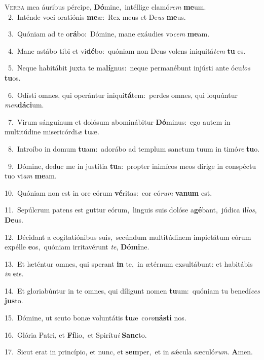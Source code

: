 \lettrine{\initial\textcolor{\initialcolor}{V}}{erba} mea áuribus pércipe, \textbf{Dó}\-mine,~\star intéllige clamó\textit{rem} \textbf{me}\-um.\\
{\numbfont\textcolor{\numbcolor}{~2.}}~Inténde voci oratiónis \textbf{me}\-æ:~\star Rex meus et De\textit{us} \textbf{me}\-us.\par
{\numbfont\textcolor{\numbcolor}{~3.}}~Quóniam ad te o\-\textbf{rá}\-bo:~\star Dómine, mane exáudies vo\textit{cem} \textbf{me}\-am.\par
{\numbfont\textcolor{\numbcolor}{~4.}}~Mane astábo tibi et vi\-\textbf{dé}\-bo:~\star quóniam non Deus volens iniquitá\textit{tem} \textbf{tu} es.\par
{\numbfont\textcolor{\numbcolor}{~5.}}~Neque habitábit juxta te ma\-\textbf{lí}\-gnus:~\star neque permanébunt injústi ante ócu\textit{los} \textbf{tu}\-os.\par
{\numbfont\textcolor{\numbcolor}{~6.}}~Odísti omnes, qui operántur iniqui\-\textbf{tá}\-tem:~\star perdes omnes, qui loquúntur \textit{men}\-\textbf{dá}\textbf{ci}um.\par
{\numbfont\textcolor{\numbcolor}{~7.}}~Virum sánguinum et dolósum abominábitur \textbf{Dó}\-minus:~\star ego autem in multitúdine misericórdi\textit{æ} \textbf{tu}\-æ.\par
{\numbfont\textcolor{\numbcolor}{~8.}}~Introíbo in domum \textbf{tu}\-am:~\star adorábo ad templum sanctum tuum in timó\textit{re} \textbf{tu}\-o.\par
{\numbfont\textcolor{\numbcolor}{~9.}}~Dómine, deduc me in justítia \textbf{tu}\-a:~\star propter inimícos meos dírige in conspéctu tuo vi\textit{am} \textbf{me}\-am.\par
{\numbfont\textcolor{\numbcolor}{10.}}~Quóniam non est in ore eórum \textbf{vé}\-ritas:~\star cor eó\textit{rum} \textbf{va}\-\textbf{num} est.\par
{\numbfont\textcolor{\numbcolor}{11.}}~Sepúlcrum patens est guttur eórum,~\dagger linguis suis dolóse a\-\textbf{gé}\-bant,~\star júdica il\-\textit{los}\-, \textbf{De}\-us.\par
{\numbfont\textcolor{\numbcolor}{12.}}~Décidant a cogitatiónibus suis,~\dagger secúndum multitúdinem impietátum eórum expélle \textbf{e}\-os,~\star quóniam irritavérunt \textit{te}\-, \textbf{Dó}\-\textbf{mi}ne.\par
{\numbfont\textcolor{\numbcolor}{13.}}~Et læténtur omnes, qui sperant \textbf{in} te,~\star in ætérnum exsultábunt: et habitábis \textit{in} \textbf{e}\-is.\par
{\numbfont\textcolor{\numbcolor}{14.}}~Et gloriabúntur in te omnes, qui díligunt nomen \textbf{tu}\-um:~\star quóniam tu benedí\textit{ces} \textbf{jus}\-to.\par
{\numbfont\textcolor{\numbcolor}{15.}}~Dómine, ut scuto bonæ voluntátis \textbf{tu}\-æ~\star co\-\textit{ro}\-\textbf{nás}\textbf{ti} nos.\par
{\numbfont\textcolor{\numbcolor}{16.}}~Glória Patri, et \textbf{Fí}\-lio,~\star et Spirítu\textit{i} \textbf{Sanc}\-to.\par
{\numbfont\textcolor{\numbcolor}{17.}}~Sicut erat in princípio, et nunc, et \textbf{sem}\-per,~\star et in sǽcula sæculó\-\textit{rum}\-. \textbf{A}\-men.\par
